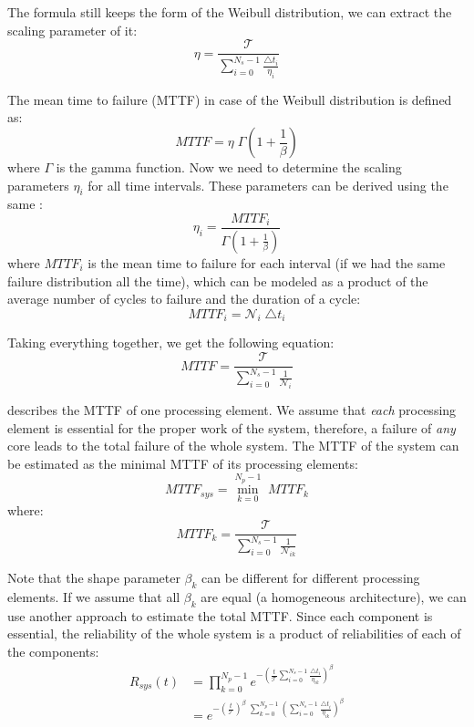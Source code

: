 The formula still keeps the form of the Weibull distribution, we can extract the scaling parameter of it:
\[
  \eta = \frac{\mathcal{T}}{\sum_{i=0}^{N_s - 1} \frac{\triangle t_i}{\eta_i}}
\]

The mean time to failure (MTTF) in case of the Weibull distribution is defined as:
\begin{equation} \label{eq:general-mttf}
  MTTF = \eta \; \Gamma(1 + \frac{1}{\beta})
\end{equation}
where $\Gamma$ is the gamma function. Now we need to determine the scaling parameters $\eta_i$ for all time intervals. These parameters can be derived using the same :
\[
  \eta_i = \frac{MTTF_i}{\Gamma(1 + \frac{1}{\beta})}
\]
where $MTTF_i$ is the mean time to failure for each interval (if we had the same failure distribution all the time), which can be modeled as a product of the average number of cycles to failure  and the duration of a cycle:
\[
  MTTF_i = \mathcal{N}_i \; \triangle t_i
\]

Taking everything together, we get the following equation:
\begin{equation} \label{eq:one-mttf}
  MTTF = \frac{\mathcal{T}}{\sum_{i=0}^{N_s - 1} \frac{1}{\mathcal{N}_i}}
\end{equation}

 describes the MTTF of one processing element. We assume that \emph{each} processing element is essential for the proper work of the system, therefore, a failure of \emph{any} core leads to the total failure of the whole system. The MTTF of the system can be estimated as the minimal MTTF of its processing elements:
\[
  MTTF_{sys} = \min_{k=0}^{N_p - 1} \; MTTF_k
\]
where:
\[
  MTTF_k = \frac{\mathcal{T}}{\sum_{i=0}^{N_s - 1} \frac{1}{\mathcal{N}_{ik}}}
\]

Note that the shape parameter $\beta_k$ can be different for different processing elements. If we assume that all $\beta_k$ are equal (a homogeneous architecture), we can use another approach to estimate the total MTTF. Since each component is essential, the reliability of the whole system is a product of reliabilities of each of the components:
\begin{align*}
  R_{sys}(t) & = \prod_{k=0}^{N_p - 1} e^{-\left( \frac{t}{\mathcal{T}} \sum_{i=0}^{N_s - 1} \frac{\triangle t_i}{\eta_{ik}} \right)^{\beta}} \\
  & = e^{- \left(\frac{t}{\mathcal{T}}\right)^{\beta} \; \sum_{k = 0}^{N_p - 1} \left( \sum_{i=0}^{N_s - 1} \frac{\triangle t_i}{\eta_{ik}} \right)^{\beta}}
\end{align*}

